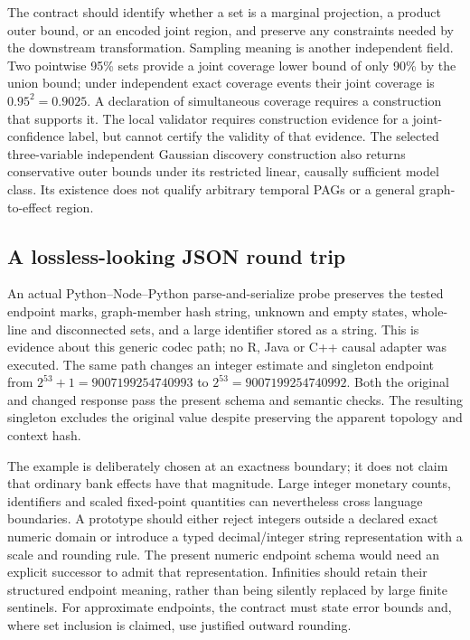 The contract should identify whether a set is a marginal projection, a product
outer bound, or an encoded joint region, and preserve any constraints needed
by the downstream transformation. Sampling meaning is another independent
field. Two pointwise 95\% sets provide a joint coverage lower bound of only
90\% by the union bound; under independent exact coverage events their joint
coverage is \(0.95^2=0.9025\). A declaration of simultaneous coverage requires
a construction that supports it. The local validator requires construction
evidence for a joint-confidence label, but cannot certify the validity of
that evidence. The selected three-variable independent Gaussian discovery
construction also returns conservative outer bounds under its restricted
linear, causally sufficient model class. Its existence does not qualify
arbitrary temporal PAGs or a general graph-to-effect region.
\citep{exec16_topology_runtime,exec16_topology_exact,exec16_topology_source}

\subsection{A lossless-looking JSON round trip}

An actual Python--Node--Python parse-and-serialize probe preserves the tested
endpoint marks, graph-member hash string, unknown and empty states, whole-line
and disconnected sets, and a large identifier stored as a string. This is
evidence about this generic codec path; no R, Java or C++ causal adapter was
executed. The same path changes an integer estimate and singleton endpoint
from \(2^{53}+1=9007199254740993\) to
\(2^{53}=9007199254740992\). Both the original and changed response pass the
present schema and semantic checks. The resulting singleton excludes the
original value despite preserving the apparent topology and context hash.
\citep{exec16_topology_codec}

The example is deliberately chosen at an exactness boundary; it does not
claim that ordinary bank effects have that magnitude. Large integer monetary
counts, identifiers and scaled fixed-point quantities can nevertheless cross
language boundaries. A prototype should either reject integers outside a
declared exact numeric domain or introduce a typed decimal/integer string
representation with a scale and rounding rule. The present numeric endpoint
schema would need an explicit successor to admit that representation.
Infinities should retain their structured endpoint meaning, rather than being
silently replaced by large finite sentinels. For approximate endpoints, the
contract must state error bounds and, where set inclusion is claimed, use
justified outward rounding.

